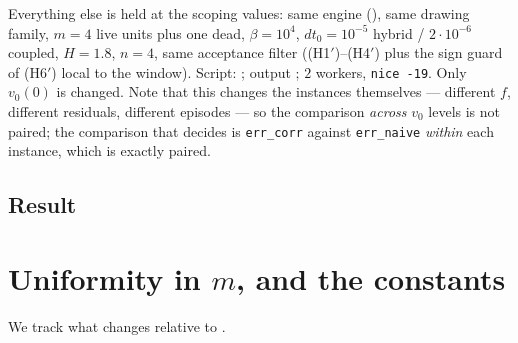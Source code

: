 \documentclass[11pt]{article}
\theoremstyle{remark}
\newcommand{\hyplabel}[1]{\textup{(#1)}}
\begin{document}
Everything else is held at the scoping values: same engine
(), same drawing family, $m=4$ live units plus one
dead, $\beta=10^4$, $dt_0=10^{-5}$ hybrid / $2\cdot10^{-6}$ coupled, $H=1.8$,
$n=4$, same acceptance filter (\hyplabel{H1$'$}--\hyplabel{H4$'$} plus the sign
guard of \hyplabel{H6$'$} local to the window). Script:
; output
; $2$ workers, \texttt{nice -19}.
Only $v_0(0)$ is changed. Note that this changes the instances themselves ---
different $f$, different residuals, different episodes --- so the comparison
\emph{across} $v_0$ levels is not paired; the comparison that decides is
\texttt{err\_corr} against \texttt{err\_naive} \emph{within} each instance,
which is exactly paired.

\subsection{Result}\label{sec:result}



\section{\texorpdfstring{Uniformity in $m$, and the constants}{Uniformity in m, and the constants}}\label{sec:unif}

We track what changes relative to \cite[Rem.~B.9]{paper}.
\end{document}
